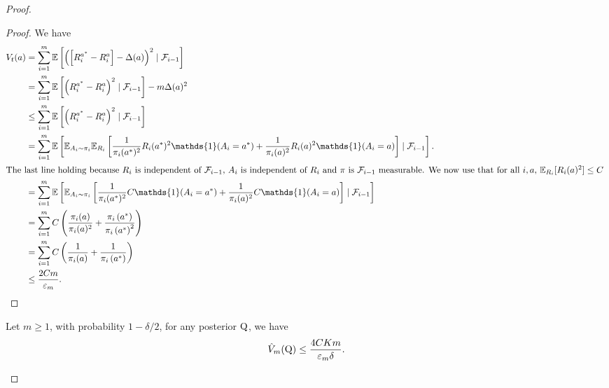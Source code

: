 \begin{proof}
\begin{proof} We have
\begin{align*}
V_t(a) &=\sum_{i=1}^m \mathbb{E}\left[\left(\left[R_i^{a^*}-R_i^a\right]-\Delta(a)\right)^2 \mid \mathcal{F}_{i-1}\right] \\
&=\sum_{i=1}^m \mathbb{E}\left[\left(R_i^{a^*}-R_i^a\right)^2 \mid \mathcal{F}_{i-1}\right]-m \Delta(a)^2\\
& \leq \sum_{i=1}^m \mathbb{E}\left[\left(R_i^{a^*}-R_i^a\right)^2 \mid \mathcal{F}_{i-1}\right]  \\
&  = \sum_{i=1}^m \mathbb{E}\left[\mathbb{E}_{A_i\sim \pi_i}\mathbb{E}_{R_i}\left[\frac{1}{\pi_i(a^*)^2} R_i(a^*)^2\mathds{1}(A_i=a^*) +\frac{1}{\pi_i(a)^2}R_i(a)^2\mathds{1}(A_i=a) \right] \mid \mathcal{F}_{i-1}\right].\\
\intertext{The last line holding because $R_i$ is independent of $\mathcal{F}_{i-1}$, $A_i$ is independent of $R_i$ and $\pi$ is $\mathcal{F}_{i-1}$ measurable.
We now use that for all $i,a$, $\mathbb{E}_{R_i}[R_i(a)^2] \leq C$ }
& = \sum_{i=1}^m \mathbb{E}\left[\mathbb{E}_{A_i\sim \pi_i}
\left[\frac{1}{\pi_i(a^*)^2} C\mathds{1}(A_i=a^*) +\frac{1}{\pi_i(a)^2}C\mathds{1}(A_i=a) \right] \mid \mathcal{F}_{i-1}\right]\\
& =\sum_{i=1}^m C\left(\frac{\pi_i(a)}{\pi_i(a)^2}+\frac{\pi_i\left(a^*\right)}{\pi_i\left(a^*\right)^2}\right) \\ &=\sum_{i=1}^m C\left(\frac{1}{\pi_i(a)}+\frac{1}{\pi_i\left(a^*\right)} \right) \\
& \leq \frac{2C m}{\varepsilon_m}.
\end{align*}
\end{proof}


\begin{lemma}
\label{l: bandit_lemma_2}
Let $m\geq 1$, with probability $1-\delta/2$, for any posterior $\mathrm{Q}$, we have
\[ \hat{V}_m(\mathrm{Q}) \leq \frac{4CKm}{\varepsilon_m\delta}. \]
\end{lemma}


\end{proof}
